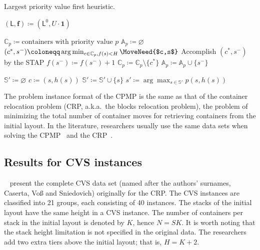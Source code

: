 \documentclass[review,3p,times,12pt,number]{elsarticle}\usepackage{amsmath}\usepackage{amssymb}
\renewcommand{\citet}[1]{\citeauthor{#1}~\citep{#1}}
\renewcommand{\gets}{\coloneqq}
\newcommand{\setalgo}{\linespread{1}\fontsize{10}{12}\selectfont}
\begin{document}
\begin{algorithm*}[htbp]
\caption{Largest priority value first heuristic.}
\label{algo:lpvfh}


\setalgo

\begin{multicols}{2}

\Begin
{
  $(\mathsf{L},\boldsymbol{f})\gets (\mathsf{L}^0,U\cdot\boldsymbol{1})$\;
  
  {
    $\mathbb{C}_p\gets\textrm{containers with priority value $p$}$\;
    $\mathbb{A}_p\gets\varnothing$
    {
      $(c^*, s^-)\gets \arg\min_{c\in\mathbb{C}_p, f(s)<H} \MoveNeed{$c,s$}$\;
      Accomplish $( c^*, s^-)$ by the STAP\;
      $f(s^-)\gets f(s^-)+1$\;
      $\mathbb{C}_p\gets\mathbb{C}_p\setminus\{c^*\}$\;
      $\mathbb{A}_p\gets \mathbb{A}_p\cup \{s^-\}$\;
    }
    {
    	\;
    }
  }
}



{
  {
    $\mathbb{S}'\gets\varnothing$\;
    {
      $c\gets (s,h(s))$\;
      {
        $\mathbb{S}'\gets \mathbb{S}'\cup \{s\}$\;
      }
    }
    {
      $s'\gets \arg\max_{s\in\mathbb{S}'} p(s,h(s))$\;
      \;
    }
    {
      \Break\;
    }
  }
}
\end{multicols}
\BlankLine
\BlankLine
\end{algorithm*}





The problem instance format of the CPMP is the same as that of the {container relocation problem} (CRP, a.k.a.\ the blocks relocation problem), the problem of minimizing the total number of container moves for retrieving containers from the initial layout. 
In the literature, researchers usually use the same data sets when solving the CPMP~\citep{bort2012,cas2009,exp2012,wang2015} and the CRP~\citep{cas2011,exp2014,forster2012,jin2013,jin2015}.

\subsection{Results for CVS instances}

\citet{cas2011} present the complete CVS data set (named after the authors' surnames, Caserta, Vo{\ss} and Sniedovich) originally for the CRP\@. The CVS instances are classified into 21 groups, each consisting of 40 instances. The stacks of the initial layout have the same height in a CVS instance. The number of containers per stack in the initial layout is denoted by $K$, hence $N=SK$. It is worth noting that the stack height limitation is not specified in the original data. The researchers add two extra tiers above the initial layout; that is, $H=K+2$.
\end{document}
